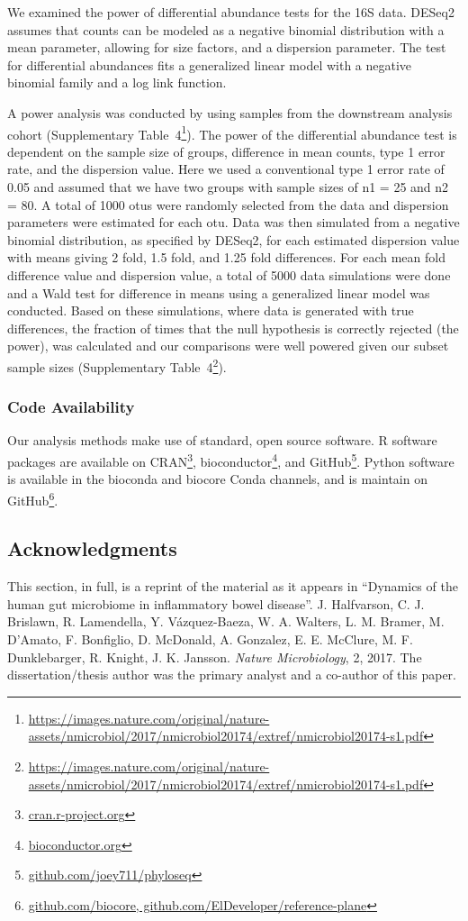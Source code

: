 We examined the power of differential abundance tests for the 16S data. DESeq2 \cite{Love2014} assumes that counts can be modeled as a negative binomial distribution with a mean parameter, allowing for size factors, and a dispersion parameter. The test for differential abundances fits a generalized linear model with a negative binomial family and a log link function. 

A power analysis was conducted by using samples from the downstream analysis cohort (Supplementary Table~4\footnote{\url{https://images.nature.com/original/nature-assets/nmicrobiol/2017/nmicrobiol20174/extref/nmicrobiol20174-s1.pdf}}). The power of the differential abundance test is dependent on the sample size of groups, difference in mean counts, type 1 error rate, and the dispersion value. Here we used a conventional type 1 error rate of 0.05 and assumed that we have two groups with sample sizes of n1 = 25 and n2 = 80. A total of 1000 \glspl{otu} were randomly selected from the data and dispersion parameters were estimated for each \gls{otu}. Data was then simulated from a negative binomial distribution, as specified by DESeq2, for each estimated dispersion value with means giving 2 fold, 1.5 fold, and 1.25 fold differences. For each mean fold difference value and dispersion value, a total of 5000 data simulations were done and a Wald test for difference in means using a generalized linear model was conducted. Based on these simulations, where data is generated with true differences, the fraction of times that the null hypothesis is correctly rejected (the power), was calculated and our comparisons were well powered given our subset sample sizes (Supplementary  Table~4\footnote{\url{https://images.nature.com/original/nature-assets/nmicrobiol/2017/nmicrobiol20174/extref/nmicrobiol20174-s1.pdf}}). 

\subsubsection{Code Availability}

Our analysis methods make use of standard, open source software. R software 
packages are available on CRAN\footnote{\url{cran.r-project.org}}, 
bioconductor\footnote{\url{bioconductor.org}}, and 
GitHub\footnote{\url{github.com/joey711/phyloseq}}. Python software is 
available in the bioconda and biocore Conda channels, and is maintain on 
GitHub\footnote{\url{github.com/biocore, 
github.com/ElDeveloper/reference-plane}}.

\subsection{Acknowledgments}

This section, in full, is a reprint of the material as it appears in ``Dynamics 
of the human gut microbiome in inflammatory bowel disease''.  J. Halfvarson, C.  
J.  Brislawn, R. Lamendella, Y.  V\'azquez-Baeza, W. A. Walters, L. M. Bramer, 
M.  D'Amato, F.  Bonfiglio, D.  McDonald, A.  Gonzalez, E. E. McClure, M. F.  
Dunklebarger, R. Knight, J.  K.  Jansson.  \emph{Nature Microbiology}, 2, 2017.  
The dissertation/thesis author was the primary analyst and a co-author of this 
paper.
